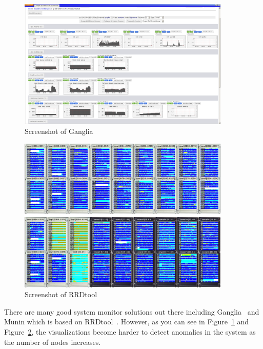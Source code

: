 \documentclass[conference]{acmsiggraph}
\begin{document}
\begin{figure}[p]
    \centering
    \includegraphics[width=0.9\textwidth]{images/ganglia.png}
    \caption{Screenshot of Ganglia\protect\footnotemark}
    \label{fig:ganglia}
\end{figure}
\begin{figure}[p]
    \centering
    \includegraphics[width=0.9\textwidth]{images/rrdtool.png}
    \caption{Screenshot of RRDtool\protect\footnotemark}
    \label{fig:rrdtool}
\end{figure}

There are many good system monitor solutions out there including Ganglia~\cite{Massie04} and Munin
which is based on RRDtool~\cite{Oetiker99}. However, as you can see in Figure~\ref{fig:ganglia} and
Figure~\ref{fig:rrdtool}, the visualizations become harder to detect anomalies in the system as the
number of nodes increases.
\end{document}
